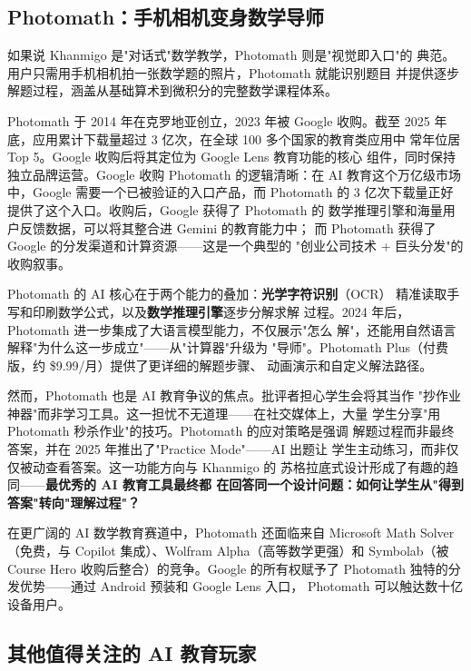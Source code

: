 \subsection{Photomath：手机相机变身数学导师}
\label{subsec:photomath}

如果说 Khanmigo 是"对话式"数学教学，Photomath 则是"视觉即入口"的
典范。用户只需用手机相机拍一张数学题的照片，Photomath 就能识别题目
并提供逐步解题过程，涵盖从基础算术到微积分的完整数学课程体系。

Photomath 于 2014 年在克罗地亚创立，2023 年被 Google 收购。截至 2025
年底，应用累计下载量超过 3 亿次，在全球 100 多个国家的教育类应用中
常年位居 Top 5。Google 收购后将其定位为 Google Lens 教育功能的核心
组件，同时保持独立品牌运营。Google 收购 Photomath 的逻辑清晰：在 AI
教育这个万亿级市场中，Google 需要一个已被验证的入口产品，而 Photomath
的 3 亿次下载量正好提供了这个入口。收购后，Google 获得了 Photomath 的
数学推理引擎和海量用户反馈数据，可以将其整合进 Gemini 的教育能力中；
而 Photomath 获得了 Google 的分发渠道和计算资源——这是一个典型的
"创业公司技术 + 巨头分发"的收购叙事。

Photomath 的 AI 核心在于两个能力的叠加：\textbf{光学字符识别}（OCR）
精准读取手写和印刷数学公式，以及\textbf{数学推理引擎}逐步分解求解
过程。2024 年后，Photomath 进一步集成了大语言模型能力，不仅展示"怎么
解"，还能用自然语言解释"为什么这一步成立"——从"计算器"升级为
"导师"。Photomath Plus（付费版，约 \$9.99/月）提供了更详细的解题步骤、
动画演示和自定义解法路径。

然而，Photomath 也是 AI 教育争议的焦点。批评者担心学生会将其当作
"抄作业神器"而非学习工具。这一担忧不无道理——在社交媒体上，大量
学生分享"用 Photomath 秒杀作业"的技巧。Photomath 的应对策略是强调
解题过程而非最终答案，并在 2025 年推出了"Practice Mode"——AI 出题让
学生主动练习，而非仅仅被动查看答案。这一功能方向与 Khanmigo 的
苏格拉底式设计形成了有趣的趋同——\textbf{最优秀的 AI 教育工具最终都
在回答同一个设计问题：如何让学生从"得到答案"转向"理解过程"？}

在更广阔的 AI 数学教育赛道中，Photomath 还面临来自 Microsoft Math
Solver（免费，与 Copilot 集成）、Wolfram Alpha（高等数学更强）和
Symbolab（被 Course Hero 收购后整合）的竞争。Google 的所有权赋予了
Photomath 独特的分发优势——通过 Android 预装和 Google Lens 入口，
Photomath 可以触达数十亿设备用户。


\subsection{其他值得关注的 AI 教育玩家}
\label{subsec:edu-others}

